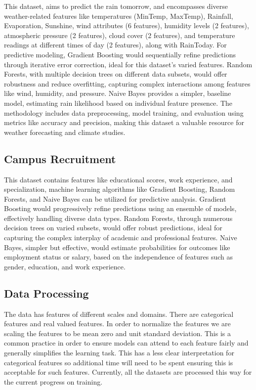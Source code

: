 \documentclass[10pt,twocolumn,letterpaper]{article}
\begin{document}
This dataset, aims to predict the rain tomorrow, and encompasses diverse weather-related features like temperatures (MinTemp, MaxTemp), Rainfall, Evaporation, Sunshine, wind attributes (6 features), humidity levels (2 features), atmospheric pressure (2 features), cloud cover (2 features), and temperature readings at different times of day (2 features), along with RainToday.
For predictive modeling, Gradient Boosting would sequentially refine predictions through iterative error correction, ideal for this dataset’s varied features.
Random Forests, with multiple decision trees on different data subsets, would offer robustness and reduce overfitting, capturing complex interactions among features like wind, humidity, and pressure.
Naive Bayes provides a simpler, baseline model, estimating rain likelihood based on individual feature presence.
The methodology includes data preprocessing, model training, and evaluation using metrics like accuracy and precision, making this dataset a valuable resource for weather forecasting and climate studies.

\subsection{Campus Recruitment \cite{ds4}}

This dataset contains features like educational scores, work experience, and specialization, machine learning algorithms like Gradient Boosting, Random Forests, and Naive Bayes can be utilized for predictive analysis.
Gradient Boosting would progressively refine predictions using an ensemble of models, effectively handling diverse data types.
Random Forests, through numerous decision trees on varied subsets, would offer robust predictions, ideal for capturing the complex interplay of academic and professional features.
Naive Bayes, simpler but effective, would estimate probabilities for outcomes like employment status or salary, based on the independence of features such as gender, education, and work experience.

\subsection{Data Processing}

The data has features of different scales and domains.
There are categorical features and real valued features.
In order to normalize the features we are scaling the features to be mean zero and unit standard deviation.
This is a common practice in order to ensure models can attend to each feature fairly and generally simplifies the learning task.
This has a less clear interpretation for categorical features so additional time will need to be spent ensuring this is acceptable for such features.
Currently, all the datasets are processed this way for the current progress on training.
\end{document}
